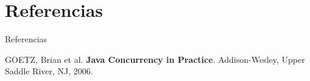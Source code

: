 \documentclass[aspectratio=169]{beamer}
\begin{document}
\section{Referencias} %
\begin{frame}{Referencias}
\begin{thebibliography}{9}
GOETZ, Brian et al.
\textbf{Java Concurrency in Practice}.
Addison-Wesley, Upper Saddle River, NJ, 2006.
\end{thebibliography}
\end{frame}
\end{document}
